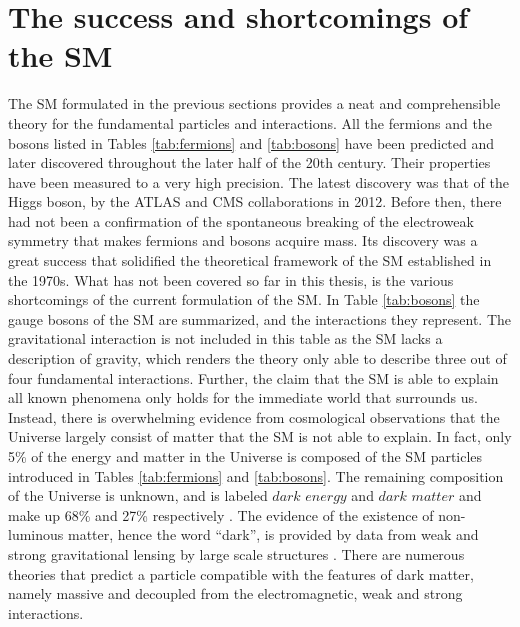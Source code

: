 \section{The success and shortcomings of the SM}
\noindent\justify
The SM formulated in the previous sections provides a neat and comprehensible theory for the fundamental particles and interactions. 
All the fermions and the bosons listed in Tables \ref{tab:fermions} and \ref{tab:bosons} have been predicted and later discovered throughout the later half of the 20th century. 
Their properties have been measured to a very high precision.  
The latest discovery was that of the Higgs boson, by the ATLAS \cite{Aad:2012tfa} and CMS \cite{Chatrchyan:2012xdj} collaborations in 2012. 
Before then, there had not been a confirmation of the spontaneous breaking of the electroweak symmetry that makes fermions and bosons acquire mass. 
Its discovery was a great success that solidified the theoretical framework of the SM established in the 1970s. 
What has not been covered so far in this thesis, is the various shortcomings of the current formulation of the SM. 
In Table \ref{tab:bosons} the gauge bosons of the SM are summarized, and the interactions they represent. 
The gravitational interaction is not included in this table as the SM lacks a description of gravity, which renders the theory only able to describe three out of four fundamental interactions. 
\newpara
\noindent\justify
Further, the claim that the SM is able to explain all known phenomena only holds for the immediate world that surrounds us. 
Instead, there is overwhelming evidence from cosmological observations that the Universe largely consist of matter that the SM is not able to explain. 
In fact, only 5\% of the energy and matter in the Universe is composed of the SM particles introduced in Tables \ref{tab:fermions} and \ref{tab:bosons}. 
The remaining composition of the Universe is unknown, and is labeled $dark$ $energy$ and $dark$ $matter$ and make up 68\% and 27\% respectively \cite{Bertone:2004pz,Aguilar:2013qda,Peebles:2002gy}. 
The evidence of the existence of non-luminous matter, hence the word ``dark'', is provided by data from weak and strong gravitational lensing by large scale structures \cite{Refregier:2003ct,Tyson:1998vp}. 
There are numerous theories that predict a particle compatible with the features of dark matter, namely massive and decoupled from the electromagnetic, weak and strong interactions.
